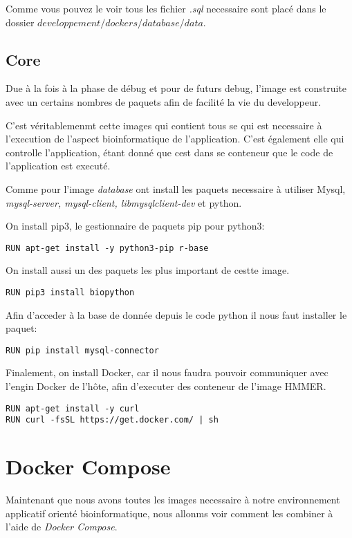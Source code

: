 Comme vous pouvez le voir tous les fichier \emph{.sql} necessaire sont placé dans le dossier \emph{$developpement/dockers/database/data$}.


\subsection{Core}
Due à la fois à la phase de débug et pour de futurs debug, l'image est construite avec un certains nombres de paquets afin de facilité la vie du developpeur.

C'est véritablemenmt cette images qui contient tous se qui est necessaire à l'execution de l'aspect bioinformatique de l'application. C'est également elle qui controlle l'application, étant donné que cest dans se conteneur que le code de l'application est executé.

Comme pour l'image \emph{database} ont install les paquets necessaire à utiliser Mysql, \emph{mysql-server, mysql-client, libmysqlclient-dev} et python.

On install pip3, le gestionnaire de paquets pip pour python3:

\begin{lstlisting}[frame=single]
RUN apt-get install -y python3-pip r-base
\end{lstlisting}

On install aussi un des paquets les plus important de cestte image.

\begin{lstlisting}[frame=single]
RUN pip3 install biopython
\end{lstlisting}

Afin d'acceder à la base de donnée depuis le code python il nous faut installer le paquet:

\begin{lstlisting}[frame=single]
RUN pip install mysql-connector
\end{lstlisting}

Finalement, on install Docker, car il nous faudra pouvoir communiquer avec l'engin Docker de l'hôte, afin d'executer des conteneur de l'image HMMER.

\begin{lstlisting}[frame=single]
RUN apt-get install -y curl
RUN curl -fsSL https://get.docker.com/ | sh
\end{lstlisting}


\section{Docker Compose}
Maintenant que nous avons toutes les images necessaire à notre environnement applicatif orienté bioinformatique, nous allonms voir comment les combiner à l'aide de \emph{Docker Compose}.


